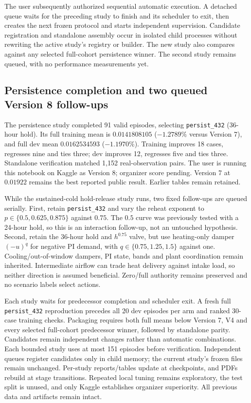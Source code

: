 The user subsequently authorized sequential automatic execution. A detached
queue waits for the preceding study to finish and its scheduler to exit,
then creates the next frozen protocol and starts independent supervision.
Candidate registration and standalone assembly occur in isolated child
processes without rewriting the active study's registry or builder. The new
study also compares against any selected full-cohort persistence winner.
The second study remains queued, with no performance measurements yet.



\subsection{Persistence completion and two queued Version 8 follow-ups}
The persistence study completed 91 valid episodes, selecting
\texttt{persist\_432} (36-hour hold). Its full training mean is $0.0141808105$
($-1.2789\%$ versus Version 7), and full dev mean $0.0162534593$
($-1.1970\%$). Training improves 18 cases, regresses nine and ties three;
dev improves 12, regresses five and ties three. Standalone verification matched
1,152 real-observation pairs. The user is running this notebook on Kaggle as
Version 8; organizer score pending. Version 7 at $0.01922$ remains the best
reported public result. Earlier tables remain retained.

While the sustained-cold hold-release study runs, two fixed follow-ups are
queued serially. First, retain \texttt{persist\_432} and vary the reheat exponent
to $p\in\{0.5,0.625,0.875\}$ against $0.75$. The $0.5$ curve was previously
tested with a 24-hour hold, so this is an interaction follow-up, not an
untouched hypothesis. Second, retain the 36-hour hold and $h^{0.75}$ valve,
but use heating-only damper $(-u)^q$ for negative PI demand, with
$q\in\{0.75,1.25,1.5\}$ against one. Cooling/out-of-window dampers, PI state,
bands and plant coordination remain inherited. Intermediate airflow can trade
heat delivery against intake load, so neither direction is assumed beneficial.
Zero/full authority remains preserved and no scenario labels select actions.

Each study waits for predecessor completion and scheduler exit. A fresh full
\texttt{persist\_432} reproduction precedes all 20 dev episodes per arm and
ranked 30-case training checks. Packaging requires both full means below
Version 7, V4 and every selected full-cohort predecessor winner, followed by
standalone parity. Candidates remain independent changes rather than automatic
combinations. Each bounded study uses at most 151 episodes before verification.
Independent queues register candidates only in child memory; the current
study's frozen files remain unchanged. Per-study reports/tables update at
checkpoints, and PDFs rebuild at stage transitions. Repeated local tuning
remains exploratory, the test split is unused, and only Kaggle establishes
organizer superiority. All previous data and artifacts remain intact.

